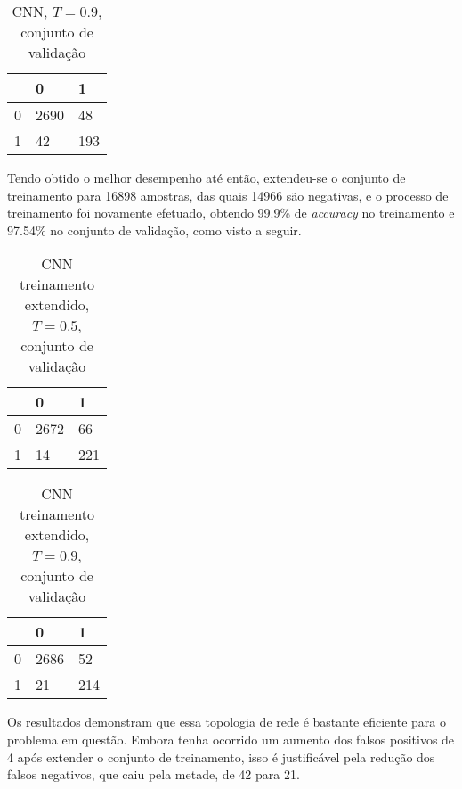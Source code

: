 \begin{table}[h!]
\centering
\caption{CNN, $T=0.9$, conjunto de validação}
\begin{tabular}{l|l|l|}
\cline{2-3}
                        & 0 & 1 \\ \hline
\multicolumn{1}{|l|}{0} & 2690 & 48 \\ \hline
\multicolumn{1}{|l|}{1} & 42   & 193 \\ \hline
\end{tabular}
\end{table}

Tendo obtido o melhor desempenho até então, extendeu-se o conjunto de treinamento para 16898 amostras, das quais 14966 são negativas, e o processo de treinamento foi novamente efetuado, obtendo 99.9\% de \textit{accuracy} no treinamento e 97.54\% no conjunto de validação, como visto a seguir.

\begin{table}[h!]
\centering
\caption{CNN treinamento extendido, $T=0.5$, conjunto de validação}
\begin{tabular}{l|l|l|}
\cline{2-3}
                        & 0 & 1 \\ \hline
\multicolumn{1}{|l|}{0} & 2672 & 66 \\ \hline
\multicolumn{1}{|l|}{1} & 14   & 221 \\ \hline
\end{tabular}
\end{table}

\begin{table}[h!]
\centering
\caption{CNN treinamento extendido, $T=0.9$, conjunto de validação}
\begin{tabular}{l|l|l|}
\cline{2-3}
                        & 0 & 1 \\ \hline
\multicolumn{1}{|l|}{0} & 2686 & 52 \\ \hline
\multicolumn{1}{|l|}{1} & 21   & 214 \\ \hline
\end{tabular}
\end{table}

Os resultados demonstram que essa topologia de rede é bastante eficiente para o problema em questão. Embora tenha ocorrido um aumento dos falsos positivos de 4 após extender o conjunto de treinamento, isso é justificável pela redução dos falsos negativos, que caiu pela metade, de 42 para 21.

